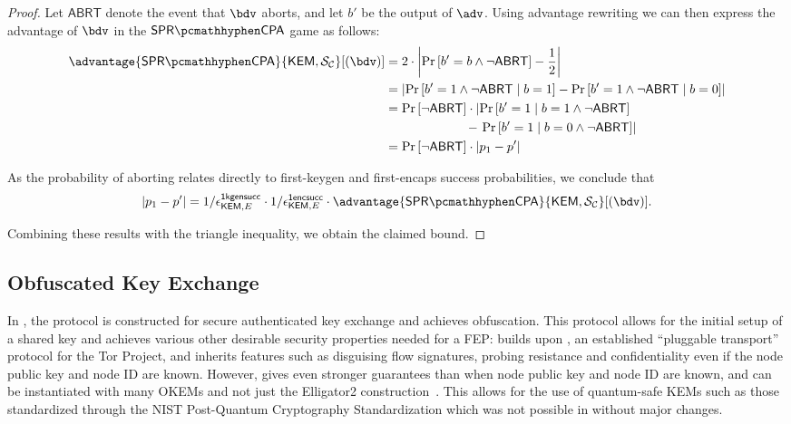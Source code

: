 \begin{proof}
    Let $\mathsf{ABRT}$ denote the event that $\bdv$ aborts, and let $b'$ be the output of $\adv$. Using advantage rewriting we can then express the advantage of $\bdv$ in the $\sprcpa$ game as follows:
    \begin{align*}
        \advantage{\sprcpa}{\KEM, \simulunif}[(\bdv)]
        &=
        2 \cdot \left|
            \Pr\left[b'=b \land \neg \mathsf{ABRT} \right] - \frac{1}{2}
        \right| \\
        &=
        \left|
            \Pr\left[b'=1 \land \neg \mathsf{ABRT} \mid b=1 \right] - \Pr\left[b'=1 \land \neg \mathsf{ABRT} \mid b=0 \right]
        \right| \\
        &=
        \Pr\left[\neg \mathsf{ABRT}\right] \cdot
        \left|
            \Pr\left[b'=1 \mid b=1 \land \neg \mathsf{ABRT} \right]
        \right.\\   
        &\qquad\qquad\qquad\  - \left.
            \Pr\left[b'=1 \mid b=0 \land \neg \mathsf{ABRT} \right]
        \right| \\
        &=
        \Pr\left[\neg \mathsf{ABRT}\right] \cdot
        \left|
            p_1 - p'
        \right|
    \end{align*}

    As the probability of aborting relates directly to first-keygen and first-encaps success probabilities, we conclude that
    \[
    \left| p_1 - p' \right| =
    1/\epsilon^\firstkeygensuccess_{\KEM,E}
    \cdot 1/\epsilon^\firstencapssuccess_{\KEM,E}
    \cdot \advantage{\sprcpa}{\KEM, \simulunif}[(\bdv)].
    \]
    
    Combining these results with the triangle inequality, we obtain the claimed bound.
\end{proof}

\subsection{Obfuscated Key Exchange} \label{ssec:prelim-obf-keyex}

In \cite{CCS:GunSteVei24}, the \pqobfs{} protocol is constructed for secure authenticated key exchange and achieves obfuscation. This protocol allows for the initial setup of a shared key and achieves various other desirable security properties needed for a FEP:
\pqobfs{} builds upon \obfsfour{} \cite{obfs4}, an established ``pluggable transport'' protocol for the Tor Project, and \pqobfs{} inherits features such as disguising flow signatures, probing resistance and confidentiality even if the node public key and node ID are known.
However, \pqobfs{} gives even stronger guarantees than \obfsfour{} when node public key and node ID are known, and can be instantiated with many OKEMs and not just the \textsf{Elligator2} construction~\cite{CCS:BHKL13}. This allows for the use of quantum-safe KEMs such as those standardized through the NIST Post-Quantum Cryptography Standardization \cite{nist-standardization} which was not possible in \obfsfour{} without major changes.

